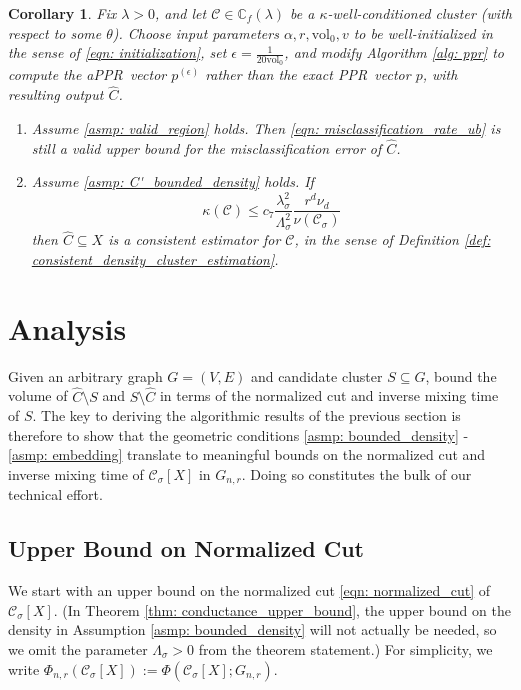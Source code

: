 \documentclass{article}
\newcommand{\vol}{\mathrm{vol}}
\newcommand{\1}{\mathbf{1}}
\newcommand{\pbf}{p}        %
\newcommand{\Xbf}{X}             %
\newcommand{\Cbb}{\mathbb{C}}
\newcommand{\Cset}{\mathcal{C}}
\newcommand{\Csig}{\Cset_{\sigma}}
\newcommand{\Cest}{\widehat{C}}
\newcommand{\pprspace}{{\sc PPR~}}
\theoremstyle{aldenthm}
\newtheorem{corollary}{Corollary}
\theoremstyle{aldenrmrk}
\begin{document}
\begin{corollary}
	\label{cor: appr}
	Fix $\lambda > 0$, and let $\Cset \in \Cbb_f(\lambda)$ be a $\kappa$-well-conditioned cluster (with respect to some $\theta$). Choose input parameters $\alpha, r, \vol_0, v$ to be well-initialized in the sense of \eqref{eqn: initialization}, set $\epsilon = \frac{1}{20 \vol_0}$, and modify Algorithm \ref{alg: ppr} to compute the a\pprspace vector $\pbf^{(\epsilon)}$ rather than the exact \pprspace vector $\pbf$, with resulting output $\Cest$.
	\begin{enumerate}
		\item Assume \ref{asmp: valid_region} holds. Then \eqref{eqn: misclassification_rate_ub} is still a valid upper bound for the misclassification error of $\Cest$.
		\item Assume \ref{asmp: C'_bounded_density} holds. If
		\begin{equation*}
		\kappa(\Cset) \leq c_7 \frac{\lambda_{\sigma}^2}{\Lambda_{\sigma}^2} \frac{r^d \nu_d}{\nu(\Csig)}
		\end{equation*}
		then $\Cest \subseteq \Xbf$ is a consistent estimator for $\Cset$, in the sense of Definition \ref{def: consistent_density_cluster_estimation}.
	\end{enumerate}
\end{corollary}

\section{Analysis}
Given an arbitrary graph $G = (V,E)$ and candidate cluster $S \subseteq G$, \cite{zhu2013} bound the volume of $\Cest \setminus S$ and $S \setminus \Cest$ in terms of the normalized cut and inverse mixing time of $S$. The key to deriving the algorithmic results of the previous section is therefore to show that the geometric conditions \ref{asmp: bounded_density} - \ref{asmp: embedding} translate to meaningful bounds on the normalized cut and inverse mixing time of $\Csig[\Xbf]$ in $G_{n,r}$. Doing so constitutes the bulk of our technical effort.

\subsection{Upper Bound on Normalized Cut}

We start with an upper bound on the normalized cut \eqref{eqn: normalized_cut} of 
$\Cset_\sigma[\Xbf]$. (In Theorem \ref{thm: conductance_upper_bound}, the upper bound on the density in
Assumption \ref{asmp: bounded_density} will not actually be needed, so we omit
the parameter $\Lambda_\sigma>0$ from the theorem statement.) For simplicity, we write $\Phi_{n,r}(\Csig[\Xbf]) := \Phi(\Csig[\Xbf]; G_{n,r})$.
\end{document}
